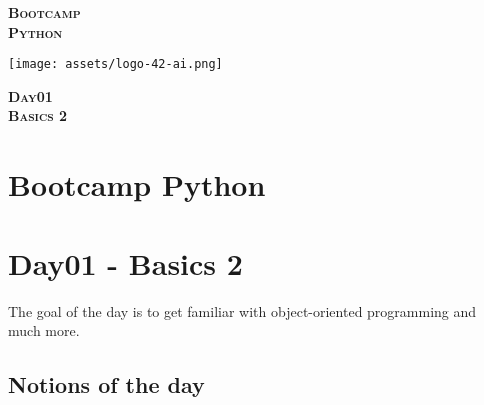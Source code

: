 \documentclass[]{article}
\date{}
\begin{document}

\vspace*{2cm}
\begin{center}
    \textsc{\fontsize{40}{48} \bfseries Bootcamp}\\[0.6cm]
    \textsc{\fontsize{39}{48} \bfseries { %
Python
    }}\\[0.3cm]
\end{center}
\vspace{3cm}

\begin{center}
\texttt{[image: assets/logo-42-ai.png]}{\centering}
\end{center}

\vspace*{2cm}
\begin{center}
    \textsc{\fontsize{32}{48} \bfseries %
Day01    
    }\\[0.6cm]
    \textsc{\fontsize{32}{48} \bfseries %
Basics 2    
    }\\[0.3cm]
\end{center}
\vspace{3cm}

\newpage

\setcounter{page}{1}



\hypertarget{bootcamp-python}{%
\section{Bootcamp Python}\label{bootcamp-python}}

\hypertarget{day01---basics-2}{%
\section{Day01 - Basics 2}\label{day01---basics-2}}

The goal of the day is to get familiar with object-oriented programming
and much more.

\hypertarget{notions-of-the-day}{%
\subsection{Notions of the day}\label{notions-of-the-day}}
\end{document}
